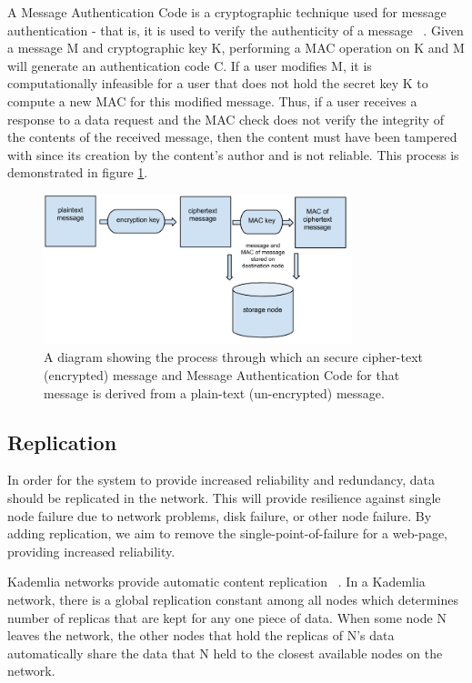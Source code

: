 A Message Authentication Code is a cryptographic technique used for message authentication - that is, it is used to verify
the authenticity of a message ~\cite{hmac}. Given a message M and cryptographic key K, performing a MAC operation on K and
M will generate an authentication code C. If a user modifies M, it is computationally infeasible for a user that does not
hold the secret key K to compute a new MAC for this modified message. Thus, if a user receives a response to a data request and
the MAC check does not verify the integrity of the contents of the received message, then the content must have been tampered
with since its creation by the content's author and is not reliable. This process is demonstrated in figure \ref{fig:hmac}.

\begin{figure}[H]
    \centering
    \includegraphics[width=0.8\textwidth]{img/mac.png}
    \caption{A diagram showing the process through which an secure cipher-text (encrypted) message and Message
    Authentication Code for that message is derived from a plain-text (un-encrypted) message.}
    \label{fig:hmac}
\end{figure}


\subsection{Replication}

In order for the system to provide increased reliability and redundancy, data should be
replicated in the network. This will provide resilience against single node failure due to network problems,
disk failure, or other node failure. By adding replication, we aim to remove the single-point-of-failure for a
web-page, providing increased reliability.

Kademlia networks provide automatic content replication ~\cite{kademlia}. In a Kademlia network, there is a
global replication constant among all nodes which determines number of replicas that are kept for any
one piece of data. When some node N leaves the network, the other nodes that hold the replicas of N's data
automatically share the data that N held to the closest available nodes on the network.

